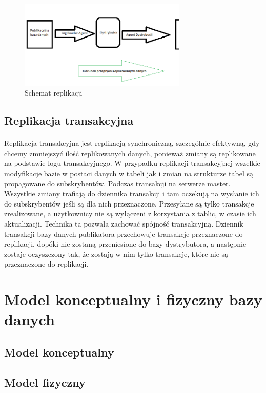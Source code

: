 \documentclass{article}
\begin{document}
	\begin{figure}[hbt!]
		\includegraphics[width=8cm]{Files/Pictures/ReplikacjaArchitektura}
		\centering
		\caption{Schemat replikacji}
	\end{figure}

	\subsection{Replikacja transakcyjna}
	\paragraph{} Replikacja transakcyjna jest replikacją synchroniczną, szczególnie efektywną, gdy chcemy zmniejszyć ilość replikowanych danych, ponieważ zmiany są replikowane na podstawie logu transakcyjnego. W przypadku replikacji transakcyjnej wszelkie modyfikacje bazie w postaci danych w tabeli jak i zmian na strukturze tabel są propagowane do subskrybentów. Podczas transakcji na serwerze master. Wszystkie zmiany trafiają do dziennika transakcji i tam oczekują na wysłanie ich do subskrybentów jeśli są dla nich przeznaczone. Przesyłane są tylko transakcje zrealizowane, a użytkownicy nie są wyłączeni z korzystania z tablic, w czasie ich aktualizacji. Technika ta pozwala zachować spójność transakcyjną. Dziennik transakcji bazy danych publikatora przechowuje transakcje przeznaczone do replikacji, dopóki nie zostaną przeniesione do bazy dystrybutora, a następnie zostaje oczyszczony tak, że zostają w nim tylko transakcje, które nie są przeznaczone do replikacji.
	

\section{Model konceptualny i fizyczny bazy danych}
	\subsection{Model konceptualny}

	\subsection{Model fizyczny}
\end{document}

